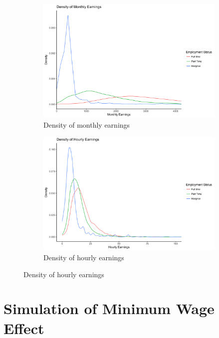 \documentclass[a4paper]{article}
\begin{document}
\begin{figure}
\begin{subfigure}[h]{0.5\linewidth}
\includegraphics[width=\textwidth]{q2/plot_output_density_monthly_earnings.png}
\caption{Density of monthly earnings}
\end{subfigure}
\hfill
\begin{subfigure}[h]{0.5\linewidth}
\includegraphics[width=\textwidth]{q2/plot_output_density_earnings.png}
\caption{Density of hourly earnings}
\end{subfigure}%
\label{q6m}
\end{figure}



\section{Simulation of Minimum Wage Effect}
\end{document}

